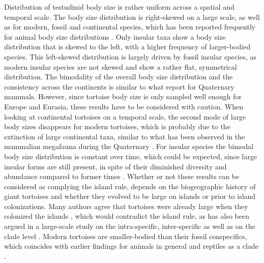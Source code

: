 Distribution of testudinid body size is rather uniform across a spatial and temporal scale.
The body size distribution is right-skewed on a large scale, as well as for modern, fossil and continental species, which has been reported frequently for animal body size distributions \citep{Blackburn1994,Kozlowski2002}.
Only insular taxa show a body size distribution that is skewed to the left, with a higher frequency of larger-bodied species. This left-skewed distribution is largely driven by fossil insular species, as modern insular species are not skewed and show a rather flat, symmetrical distribution.
The bimodality of the overall body size distribution and the consistency across the continents is similar to what \cite{Lyons2008} report for Quaternary mammals. However, since tortoise body size is only sampled well enough for Europe and Eurasia, these results have to be considered with caution.
When looking at continental tortoises on a temporal scale, the second mode of large body sizes disappears for modern tortoises, which is probably due to the extinction of large continental taxa, similar to what has been observed in the mammalian megafauna during the Quaternary \citep{Lyons2008}. For insular species the bimodal body size distribution is constant over time, which could be expected, since large insular forms are still present, in spite of their diminished diversity and abundance compared to former times \citep{Rhodin2015}.
Whether or not these results can be considered as complying the island rule, depends on the biogeographic history of giant tortoises and whether they evolved to be large on islands or prior to island colonizations. Many authors agree that tortoises were already large when they colonized the islands \citep{Itescu2014,Cheke2016, Gerlach2006}, which would contradict the island rule, as has also been argued in a large-scale study on the intra-specific, inter-specific as well as on the clade level \citep{Itescu2014}. 
Modern tortoises are smaller-bodied than their fossil conspecifics, which coincides with earlier findings for animals in general \citep{Blackburn1994} and reptiles as a clade \citep{Smith2016}.








